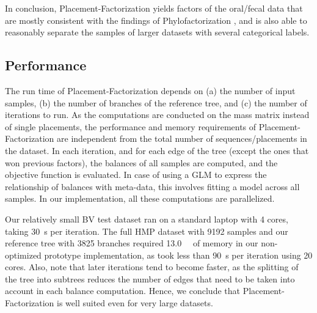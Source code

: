 In conclusion, Placement-Factorization yields factors of the oral/fecal data
that are mostly consistent with the findings of Phylofactorization \cite{Washburne2017a},
and is also able to reasonably separate the samples of larger datasets with several categorical labels.


\subsection{Performance}
\label{ch:Factorization:sec:Evaluation:sub:Performance}

The run time of Placement-Factorization depends on
(a) the number of input samples, (b) the number of branches of the reference tree, and (c) the number of iterations to run.
As the computations are conducted on the mass matrix instead of single placements,
the performance and memory requirements of Placement-Factorization are independent
from the total number of sequences/placements in the dataset.
In each iteration, and for each edge of the tree (except the ones that won previous factors),
the balances of all samples are computed, and the objective function is evaluated.
In case of using a \ac{GLM} to express the relationship of balances with meta-data,
this involves fitting a model across all samples.
In our implementation, all these computations are parallelized.

Our relatively small \ac{BV} test dataset ran on a standard laptop with \num{4} cores,
taking \SI{30}{\second} per iteration.
The full \ac{HMP} dataset with \num{9 192} samples and our reference tree with \num{3 825} branches
required \SI{13.0}{\giga\byte} of memory in our non-optimized prototype implementation,
as took less than \SI{90}{\second} per iteration using \num{20} cores.
Also, note that later iterations tend to become faster,
as the splitting of the tree into subtrees reduces the number of edges
that need to be taken into account in each balance computation.
Hence, we conclude that Placement-Factorization is well suited even for very large datasets.


